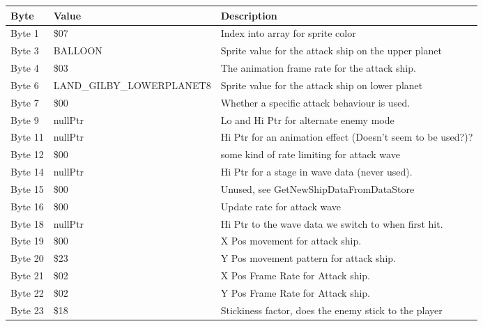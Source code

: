 \begin{figure}[H]
{\begin{adjustbox}{width=12cm}
\begin{tabular}{lll}
\toprule
 Byte    & Value                   & Description                                                        \\
\midrule
 Byte 1  & \$07                     & Index into array for sprite color                                  \\
 Byte 3  & BALLOON                 & Sprite value for the attack ship on the upper planet               \\
 Byte 4  & \$03                     & The animation frame rate for the attack ship.                      \\
 Byte 6  & LAND\_GILBY\_LOWERPLANET8 & Sprite value for the attack ship on lower planet                   \\
 Byte 7  & \$00                     & Whether a specific attack behaviour is used.                       \\
 Byte 9  & nullPtr                 & Lo and Hi Ptr for alternate enemy mode                             \\
 Byte 11 & nullPtr                 & Hi Ptr for an animation effect (Doesn't seem to be used?)?         \\
 Byte 12 & \$00                     & some kind of rate limiting for attack wave                         \\
 Byte 14 & nullPtr                 & Hi Ptr for a stage in wave data (never used).                      \\
 Byte 15 & \$00                     & Unused, see GetNewShipDataFromDataStore                            \\
 Byte 16 & \$00                     & Update rate for attack wave                                        \\
 Byte 18 & nullPtr                 & Hi Ptr to the wave data we switch to when first hit.               \\
 Byte 19 & \$00                     & X Pos movement for attack ship.                                    \\
 Byte 20 & \$23                     & Y Pos movement pattern for attack ship.                            \\
 Byte 21 & \$02                     & X Pos Frame Rate for Attack ship.                                  \\
 Byte 22 & \$02                     & Y Pos Frame Rate for Attack ship.                                  \\
 Byte 23 & \$18                     & Stickiness factor, does the enemy stick to the player              \\

\end{tabular}
\end{adjustbox}}
\end{figure}
